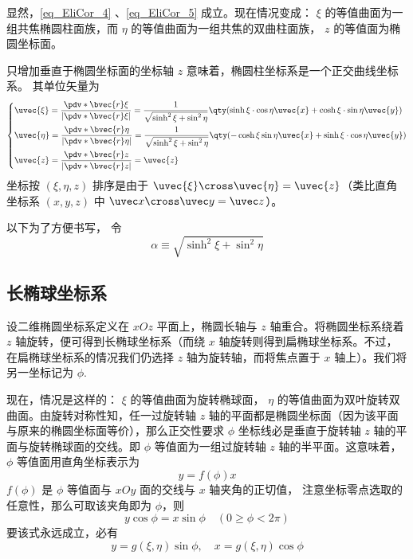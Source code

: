 显然，\autoref{eq_EliCor_4} 、\autoref{eq_EliCor_5} 成立。现在情况变成： $\xi$ 的等值曲面为一组共焦椭圆柱面族，而 $\eta$ 的等值曲面为一组共焦的双曲柱面族， $z$ 的等值面为椭圆坐标面。

只增加垂直于椭圆坐标面的坐标轴 $z$ 意味着，椭圆柱坐标系是一个正交曲线坐标系。 其单位矢量为
\begin{equation}
\left\{
    \begin{aligned}
    &\uvec{\xi}=\frac{\pdv*{\bvec{r}}{\xi}}{|\pdv*{\bvec{r}}{\xi}|}=\frac{1}{\sqrt{\sinh^2\xi+\sin^2\eta}}\qty(\sinh\xi\cdot\cos\eta\uvec{x}+\cosh\xi\cdot\sin\eta\uvec{y})\\
    &\uvec{\eta }=\frac{\pdv*{\bvec{r}}{\eta}}{|\pdv*{\bvec{r}}{\eta}|}=\frac{1}{\sqrt{\sinh^2\xi+\sin^2\eta}}\qty(-\cosh\xi\sin\eta\uvec{x}+\sinh\xi\cdot\cos\eta\uvec{y})\\
    &\uvec{z}=\frac{\pdv*{\bvec{r}}{z}}{|\pdv*{\bvec{r}}{z}|}=\uvec{z}
    \end{aligned}\right.
\end{equation}
坐标按 $(\xi,\eta,z)$ 排序是由于 $\uvec{\xi}\cross\uvec{\eta}=\uvec{z}$（类比直角坐标系 $(x,y,z)$ 中 $\uvec x\cross\uvec y=\uvec z$）。

以下为了方便书写， 令
\begin{equation}
\alpha \equiv \sqrt{\sinh^2\xi+\sin^2\eta}
\end{equation}

\subsection{长椭球坐标系}
设二维椭圆坐标系定义在 $xOz$ 平面上，椭圆长轴与 $z$ 轴重合。将椭圆坐标系绕着 $z$ 轴旋转，便可得到长椭球坐标系（而绕 $x$ 轴旋转则得到扁椭球坐标系。不过，在扁椭球坐标系的情况我们仍选择 $z$ 轴为旋转轴，而将焦点置于 $x$ 轴上）。我们将另一坐标记为 $\phi$.

现在，情况是这样的： $\xi$ 的等值曲面为旋转椭球面， $\eta$ 的等值曲面为双叶旋转双曲面。由旋转对称性知，任一过旋转轴 $z$ 轴的平面都是椭圆坐标面（因为该平面与原来的椭圆坐标面等价），那么正交性要求 $\phi$ 坐标线必是垂直于旋转轴 $z$ 轴的平面与旋转椭球面的交线。即 $\phi$ 等值面为一组过旋转轴 $z$ 轴的半平面。这意味着， $\phi$ 等值面用直角坐标表示为
\begin{equation}
y=f(\phi)x
\end{equation}
$f(\phi)$ 是 $\phi$ 等值面与 $xOy$ 面的交线与 $x$ 轴夹角的正切值， 注意坐标零点选取的任意性，那么可取该夹角即为 $\phi$，则
\begin{equation}
y\cos\phi = x\sin\phi\quad(0\geq\phi<2\pi)
\end{equation}
要该式永远成立，必有
\begin{equation}\label{eq_EliCor_2}
y = g(\xi,\eta)\sin\phi,\quad
x = g(\xi,\eta)\cos\phi
\end{equation}

